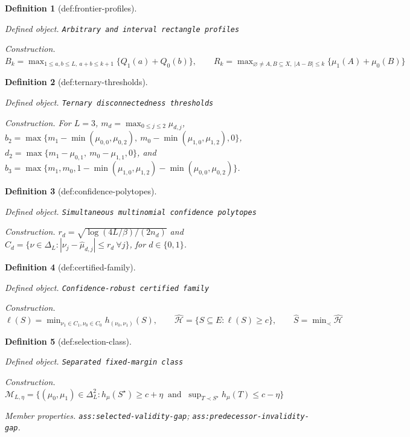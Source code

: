 \documentclass{article}
\newtheorem{definition}{Definition}
\begin{document}
\begin{definition}[def:frontier-profiles]\label{def:frontier-profiles}
\par\smallskip\noindent\emph{Defined object.} \texttt{Arbitrary and interval rectangle profiles}
\par\smallskip\noindent\emph{Construction.} \(B_k=\max_{1\leq a,b\leq L,\ a+b\leq k+1}\{Q_1(a)+Q_0(b)\},\qquad R_k=\max_{\varnothing\neq A,B\subseteq X,\ |A-B|\leq k}\{\mu_1(A)+\mu_0(B)\}\)
\end{definition}

\begin{definition}[def:ternary-thresholds]\label{def:ternary-thresholds}
\par\smallskip\noindent\emph{Defined object.} \texttt{Ternary disconnectedness thresholds}
\par\smallskip\noindent\emph{Construction.} For \(L=3\), \(m_d=\max_{0\leq j\leq2}\mu_{d,j}\), \(b_2=\max\{m_1-\min(\mu_{0,0},\mu_{0,2}),\ m_0-\min(\mu_{1,0},\mu_{1,2}),0\}\), \(d_2=\max\{m_1-\mu_{0,1},\ m_0-\mu_{1,1},0\}\), and \(b_3=\max\{m_1,m_0,1-\min(\mu_{1,0},\mu_{1,2})-\min(\mu_{0,0},\mu_{0,2})\}\).
\end{definition}

\begin{definition}[def:confidence-polytopes]\label{def:confidence-polytopes}
\par\smallskip\noindent\emph{Defined object.} \texttt{Simultaneous multinomial confidence polytopes}
\par\smallskip\noindent\emph{Construction.} \(r_d=\sqrt{\log(4L/\beta)/(2n_d)}\) and \(C_d=\{\nu\in\Delta_L:|\nu_j-\widehat\mu_{d,j}|\leq r_d\ \forall j\}\), for \(d\in\{0,1\}\).
\end{definition}

\begin{definition}[def:certified-family]\label{def:certified-family}
\par\smallskip\noindent\emph{Defined object.} \texttt{Confidence-\allowbreak{}robust certified family}
\par\smallskip\noindent\emph{Construction.} \(\ell(S)=\min_{\nu_1\in C_1,\nu_0\in C_0}h_{(\nu_0,\nu_1)}(S),\qquad\widehat{\mathcal H}=\{S\subseteq E:\ell(S)\geq c\},\qquad\widehat S=\min_{\prec}\widehat{\mathcal H}\)
\end{definition}

\begin{definition}[def:selection-class]\label{def:selection-class}
\par\smallskip\noindent\emph{Defined object.} \texttt{Separated fixed-\allowbreak{}margin class}
\par\smallskip\noindent\emph{Construction.} \(\mathcal M_{L,\eta}=\{(\mu_0,\mu_1)\in\Delta_L^2:h_{\mu}(S^\star)\geq c+\eta\ \text{ and }\ \sup_{T\prec S^\star}h_{\mu}(T)\leq c-\eta\}\)
\par\smallskip\noindent\emph{Member properties.} \texttt{ass:\allowbreak{}selected-\allowbreak{}validity-\allowbreak{}gap}; \texttt{ass:\allowbreak{}predecessor-\allowbreak{}invalidity-\allowbreak{}gap}.
\end{definition}
\end{document}
